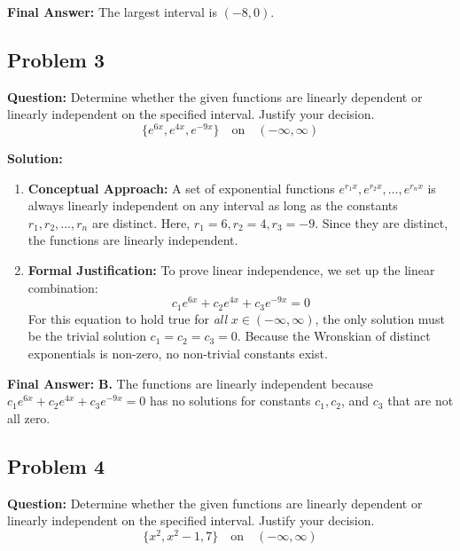 \documentclass[11pt, a4paper]{article}
\theoremstyle{definition}
\theoremstyle{remark}
\begin{document}
\textbf{Final Answer:} The largest interval is $(-8, 0)$.

\vspace{1em}
\subsection{Problem 3}
\textbf{Question:} Determine whether the given functions are linearly dependent or linearly independent on the specified interval. Justify your decision.
\[ \{e^{6x}, e^{4x}, e^{-9x}\} \quad \text{on} \quad (-\infty, \infty) \]

\textbf{Solution:}
\begin{enumerate}
    \item \textbf{Conceptual Approach:} A set of exponential functions $e^{r_1 x}, e^{r_2 x}, \dots, e^{r_n x}$ is always linearly independent on any interval as long as the constants $r_1, r_2, \dots, r_n$ are distinct. Here, $r_1 = 6, r_2 = 4, r_3 = -9$. Since they are distinct, the functions are linearly independent.
    \item \textbf{Formal Justification:} To prove linear independence, we set up the linear combination:
    \[ c_1 e^{6x} + c_2 e^{4x} + c_3 e^{-9x} = 0 \]
    For this equation to hold true for \textit{all} $x \in (-\infty, \infty)$, the only solution must be the trivial solution $c_1 = c_2 = c_3 = 0$. Because the Wronskian of distinct exponentials is non-zero, no non-trivial constants exist.
\end{enumerate}
\textbf{Final Answer:} \textbf{B.} The functions are linearly independent because $c_1 e^{6x} + c_2 e^{4x} + c_3 e^{-9x} = 0$ has no solutions for constants $c_1, c_2$, and $c_3$ that are not all zero.

\vspace{1em}
\subsection{Problem 4}
\textbf{Question:} Determine whether the given functions are linearly dependent or linearly independent on the specified interval. Justify your decision.
\[ \{x^2, x^2 - 1, 7\} \quad \text{on} \quad (-\infty, \infty) \]
\end{document}
